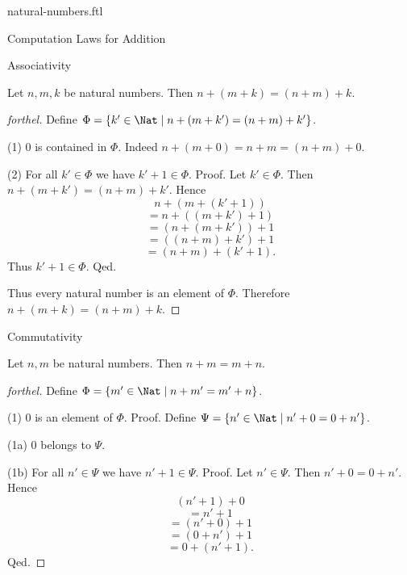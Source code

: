 \documentclass{naproche-library}
\begin{document}
\begin{smodule}[title=Natural Numbers]{natural-numbers.ftl}
\begin{sfragment}{Computation Laws for Addition}
  \begin{sfragment}{Associativity}
    \begin{proposition}[forthel,id=ARITHMETIC_03_3235893452210176]
      Let $n, m, k$ be natural numbers.
      Then $n + (m + k) = (n + m) + k$.
    \end{proposition}
    \begin{proof}[forthel]
      Define $\Phi = \{ k' \in \Nat \mid n + (m + k') = (n + m) + k' \}$.

      (1) $0$ is contained in $\Phi$.
      Indeed $n + (m + 0) = n + m = (n + m) + 0$.

      (2) For all $k' \in \Phi$ we have $k' + 1 \in \Phi$. \newline
      Proof.
        Let $k' \in \Phi$.
        Then $n + (m + k') = (n + m) + k'$.
        Hence
        \[  n + (m + (k' + 1))        \]
        \[    = n + ((m + k') + 1)    \]
        \[    = (n + (m + k')) + 1    \]
        \[    = ((n + m) + k') + 1    \]
        \[    = (n + m) + (k' + 1).   \]
        Thus $k' + 1 \in \Phi$.
      Qed.

      Thus every natural number is an element of $\Phi$.
      Therefore $n + (m + k) = (n + m) + k$.
    \end{proof}
  \end{sfragment}

  \begin{sfragment}{Commutativity}
    \begin{proposition}[forthel,id=ARITHMETIC_03_4029553232052224]
      Let $n, m$ be natural numbers.
      Then $n + m = m + n$.
    \end{proposition}
    \begin{proof}[forthel]
      Define $\Phi = \{ m' \in \Nat \mid n + m' = m' + n \}$.

      (1) $0$ is an element of $\Phi$. \newline
      Proof.
        Define $\Psi = \{ n' \in \Nat \mid n' + 0 = 0 + n' \}$.

        (1a) $0$ belongs to $\Psi$.

        (1b) For all $n' \in \Psi$ we have $n' + 1 \in \Psi$. \newline
        Proof.
          Let $n' \in \Psi$.
          Then $n' + 0 = 0 + n'$.
          Hence
          \[  (n' + 1) + 0        \]
          \[    = n' + 1          \]
          \[    = (n' + 0) + 1    \]
          \[    = (0 + n') + 1    \]
          \[    = 0 + (n' + 1).   \]
        Qed.


\end{proof}
\end{sfragment}
\end{sfragment}
\end{smodule}
\end{document}
